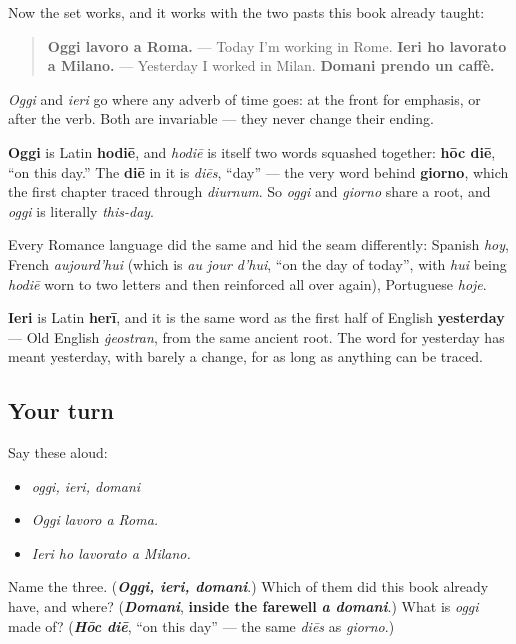 Now the set works, and it works with the two pasts this book already taught:

\begin{quote}
\textbf{Oggi lavoro a Roma.} — Today I'm working in Rome. \textbf{Ieri ho lavorato a Milano.} — Yesterday I worked in Milan. \textbf{Domani prendo un caffè.}
\end{quote}

\emph{Oggi} and \emph{ieri} go where any adverb of time goes: at the front for emphasis, or after the verb. Both are invariable — they never change their ending.

\begin{cousinweb}
\textbf{Oggi} is Latin \textbf{hodiē}, and \emph{hodiē} is itself two words squashed together: \textbf{hōc diē}, \textquotedblleft{}on this day.\textquotedblright{} The \textbf{diē} in it is \emph{diēs}, \textquotedblleft{}day\textquotedblright{} — the very word behind \textbf{giorno}, which the first chapter traced through \emph{diurnum}. So \emph{oggi} and \emph{giorno} share a root, and \emph{oggi} is literally \emph{this-day}.

Every Romance language did the same and hid the seam differently: Spanish \emph{hoy}, French \emph{aujourd'hui} (which is \emph{au jour d'hui}, \textquotedblleft{}on the day of today\textquotedblright{}, with \emph{hui} being \emph{hodiē} worn to two letters and then reinforced all over again), Portuguese \emph{hoje}.

\textbf{Ieri} is Latin \textbf{herī}, and it is the same word as the first half of English \textbf{yesterday} — Old English \emph{ġeostran}, from the same ancient root. The word for yesterday has meant yesterday, with barely a change, for as long as anything can be traced.
\end{cousinweb}

\subsection*{Your turn}
Say these aloud:

\begin{itemize}
\raggedright
  \item \emph{oggi, ieri, domani}
  \item \emph{Oggi lavoro a Roma.}
  \item \emph{Ieri ho lavorato a Milano.}
\end{itemize}

\begin{tcolorbox}[breakable,colback=teal!4,colframe=teal!35!black,title={Before you move on}]
Name the three. (\emph{\textbf{Oggi, ieri, domani}}.) Which of them did this book already have, and where? (\emph{\textbf{Domani}}, \textbf{inside the farewell} \emph{\textbf{a domani}}.) What is \emph{oggi} made of? (\emph{\textbf{Hōc diē}}, \textquotedblleft{}on this day\textquotedblright{} — the same \emph{diēs} as \emph{giorno}.)
\end{tcolorbox}
